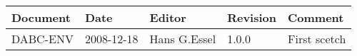 \begin{table}[h]
\begin{tabular}{|p{2.0cm}|p{2.0cm}|p{3.0cm}|p{1.6cm}|p{5.0cm}|} \hline
Document   & Date        & Editor       & Revision & Comment \\ \hline
DABC-ENV & 2008-12-18 & Hans G.Essel & 1.0.0      & First scetch \\ \hline
\end{tabular}
\end{table}
